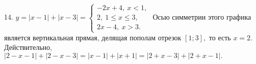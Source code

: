14. $y=|x-1|+|x-3|=\begin{cases}-2x+4,\ x<1,\\ 2,\ 1\leqslant x\leqslant 3,\\ 2x-4,\ x>3.\end{cases}$ Осью симметрии этого графика является вертикальная прямая, делящая пополам отрезок $[1;3],$ то есть $x=2.$ Действительно, $|2-x-1|+|2-x-3|=|x-1|+|x+1|=|2+x-3|+|2+x-1|.$\\
